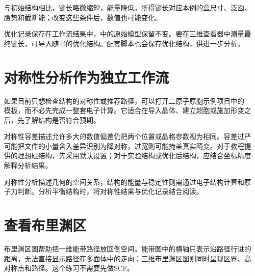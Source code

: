 与初始结构相比，键长略微缩短，能量降低。所得键长对应本例的盒尺寸、泛函、赝势和截断能；改变这些条件后，数值也可能变化。

优化记录保存在工作流结果中，中的原始模型保留不变。要在三维查看器中测量最终键长，可导入随书的优化结构。配套脚本也会保存优化结构，供进一步分析。

\section{对称性分析作为独立工作流}

如果目前只想检查结构的对称性或推荐路径，可以打开二原子原胞示例项目中的  模板，而不必先完成一整套电子计算。它适合在导入晶体、建立超胞或施加形变之后，先了解结构是否符合预期。

对称性容差描述允许多大的数值偏差仍把两个位置或晶格参数视为相同。容差过严可能把文件的小量舍入差异识别为降对称，过宽则可能掩盖真实畸变。对于教程提供的理想硅结构，先采用默认设置；对于实验结构或优化后结构，应结合坐标精度解释分析结果。

对称性分析描述几何的空间关系，结构的能量与稳定性则需通过电子结构计算和原子力判断。分析平衡结构时，将对称性结果与优化记录结合阅读。

\section{查看布里渊区}\label{sec:bz-workflow}

布里渊区图帮助把一维能带路径放回倒空间。能带图中的横轴只表示沿路径行进的距离，无法直接显示路径在多面体中的走向；三维布里渊区图则同时呈现区界、高对称点和路径。这个练习不需要先做SCF。



